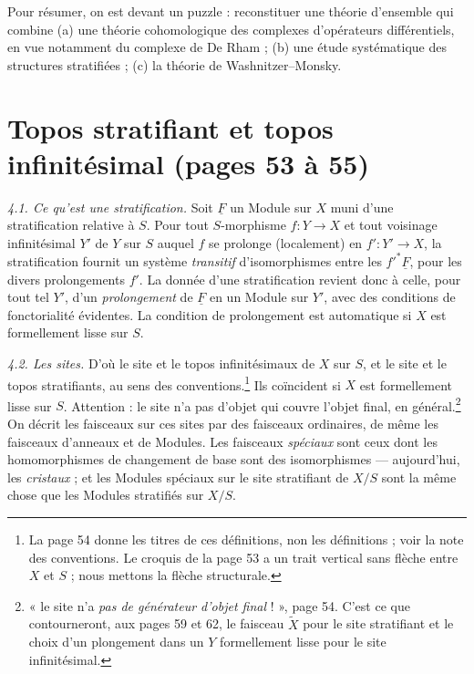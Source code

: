 \documentclass[11pt,a4paper]{article}
\begin{document}
Pour résumer, on est devant un puzzle : reconstituer une théorie d'ensemble
qui combine (a) une théorie cohomologique des complexes d'opérateurs
différentiels, en vue notamment du complexe de De Rham ; (b) une étude
systématique des structures stratifiées ; (c) la théorie de
Washnitzer--Monsky.

\section*{Topos stratifiant et topos infinitésimal (pages 53 à 55)}

\emph{4.1. Ce qu'est une stratification.} Soit $\underline{F}$ un Module sur
$X$ muni d'une stratification relative à $S$. Pour tout $S$-morphisme
$f : Y \to X$ et tout voisinage infinitésimal $Y'$ de $Y$ sur $S$ auquel $f$
se prolonge (localement) en $f' : Y' \to X$, la stratification fournit un
système \emph{transitif} d'isomorphismes entre les $f'^{*}\underline{F}$, pour
les divers prolongements $f'$. La donnée d'une stratification revient donc à
celle, pour tout tel $Y'$, d'un \emph{prolongement} de $\underline{F}$ en un
Module sur $Y'$, avec des conditions de fonctorialité évidentes. La condition
de prolongement est automatique si $X$ est formellement lisse sur $S$.


\emph{4.2. Les sites.} D'où le site et le topos infinitésimaux de $X$ sur
$S$, et le site et le topos stratifiants, au sens des
conventions.\footnote{La page 54 donne les titres de ces définitions, non les
définitions ; voir la note des conventions. Le croquis de la page 53 a un
trait vertical sans flèche entre $X$ et $S$ ; nous mettons la flèche
structurale.} Ils coïncident si $X$ est formellement lisse sur $S$.
Attention : le site n'a pas d'objet qui couvre l'objet final, en
général.\footnote{« le site n'a \emph{pas de générateur d'objet final} ! »,
page 54. C'est ce que contourneront, aux pages 59 et 62, le faisceau
$\widetilde{X}$ pour le site stratifiant et le choix d'un plongement dans un
$Y$ formellement lisse pour le site infinitésimal.} On décrit les faisceaux
sur ces sites par des faisceaux ordinaires, de même les faisceaux d'anneaux
et de Modules. Les faisceaux \emph{spéciaux} sont ceux dont les homomorphismes
de changement de base sont des isomorphismes — aujourd'hui, les
\emph{cristaux} ; et les Modules spéciaux sur le site stratifiant de $X/S$
sont la même chose que les Modules stratifiés sur $X/S$.
\end{document}
